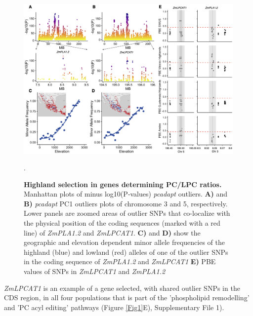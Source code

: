 \documentclass[9pt,twocolumn,twoside,lineno]{BioRxiv}
\begin{document}
\begin{figure}[h]
\begin{center}
\includegraphics[width=0.6\paperwidth]{Figures/Fig_2.png}
\caption{\textbf{Highland selection in genes determining PC/LPC ratios.}
Manhattan plots of minus log10(P‐values) \textit{pcadapt} outliers. 
\textbf{A)} and \textbf{B)} \textit{pcadapt} PC1 outliers plots of chromosome 3 and 5, respectively. 
Lower panels are zoomed areas of outlier SNPs that co-localize with the physical position of the coding sequences (marked with a red line) of \textit{ZmPLA1.2} and \textit{ZmLPCAT1}. 
\textbf{C)} and \textbf{D)} show the geographic and elevation dependent minor allele frequencies of the highland (blue) and lowland (red) alleles of one of the outlier SNPs in the coding sequence of \textit{ZmPLA1.2} and \textit{ZmLPCAT1}
\textbf{E)} PBE values of SNPs in \textit{ZmLPCAT1} and \textit{ZmPLA1.2}}. 
\label{Fig2}
\end{center}
\end{figure} 
\textit{ZmLPCAT1} is an example of a gene selected, with shared outlier SNPs in the CDS region, in all four populations that is part of the 'phospholipid remodelling' and 'PC acyl editing' pathways (Figure \ref{Fig1}E), Supplementary File 1). %
\end{document}
